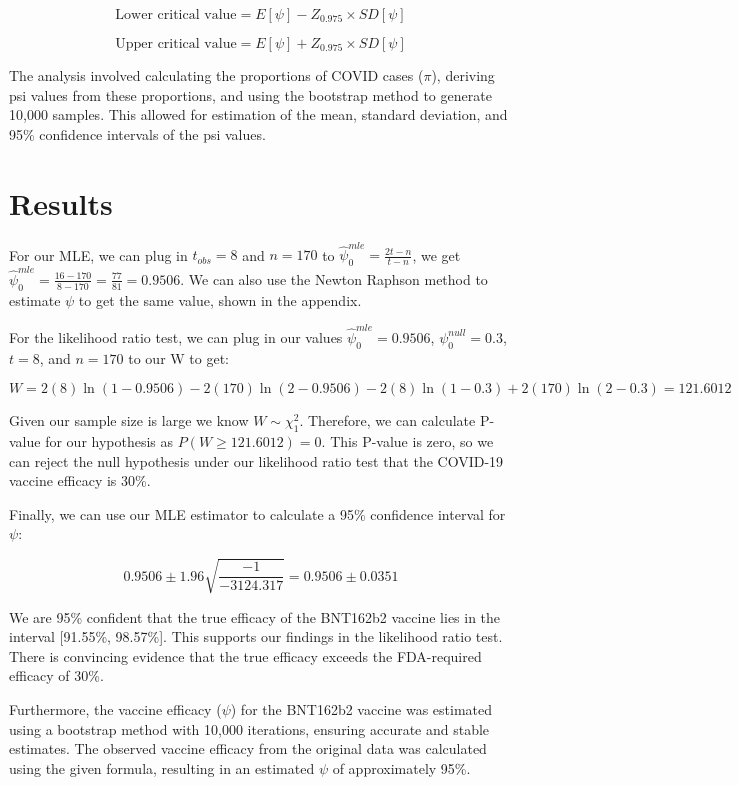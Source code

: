 \documentclass[
  11pt,
]{article}
\begin{document}
\[\text{Lower critical value} = E[\psi]- Z_{0.975} \times SD[\psi]\]

\[\text{Upper critical value} = E[\psi] + Z_{0.975} \times SD[\psi]\]

The analysis involved calculating the proportions of COVID cases
(\(\pi\)), deriving psi values from these proportions, and using the
bootstrap method to generate 10,000 samples. This allowed for estimation
of the mean, standard deviation, and 95\% confidence intervals of the
psi values.

\hypertarget{results}{%
\section{Results}\label{results}}

For our MLE, we can plug in \(t_{obs} = 8\) and \(n = 170\) to
\(\widehat{\psi}^{mle}_0 = \frac{2t - n}{t - n}\), we get
\(\widehat{\psi}^{mle}_0 = \frac{16 - 170}{8 - 170} = \frac{77}{81} = 0.9506\).
We can also use the Newton Raphson method to estimate \(\psi\) to get
the same value, shown in the appendix.

For the likelihood ratio test, we can plug in our values
\(\widehat{\psi}^{mle}_0 = 0.9506\), \(\psi^{null}_0 = 0.3\), \(t = 8\),
and \(n = 170\) to our W to get:

\[ W = 2(8)\ln\left(1 - 0.9506\right) - 2(170)\ln\left(2 - 0.9506\right) - 2(8)\ln\left(1 - 0.3\right) + 2(170)\ln\left(2 - 0.3\right) = 121.6012 \]

Given our sample size is large we know \(W \sim \chi^2_1\). Therefore,
we can calculate P-value for our hypothesis as
\(P(W \geq 121.6012) = 0\). This P-value is zero, so we can reject the
null hypothesis under our likelihood ratio test that the COVID-19
vaccine efficacy is 30\%.

Finally, we can use our MLE estimator to calculate a 95\% confidence
interval for \(\psi\):

\[ 0.9506 \pm 1.96\sqrt{\frac{-1}{-3124.317}} = 0.9506 \pm 0.0351\]

We are 95\% confident that the true efficacy of the BNT162b2 vaccine
lies in the interval {[}91.55\%, 98.57\%{]}. This supports our findings
in the likelihood ratio test. There is convincing evidence that the true
efficacy exceeds the FDA-required efficacy of 30\%.

Furthermore, the vaccine efficacy (\(\psi\)) for the BNT162b2 vaccine
was estimated using a bootstrap method with 10,000 iterations, ensuring
accurate and stable estimates. The observed vaccine efficacy from the
original data was calculated using the given formula, resulting in an
estimated \(\psi\) of approximately 95\%.
\end{document}
